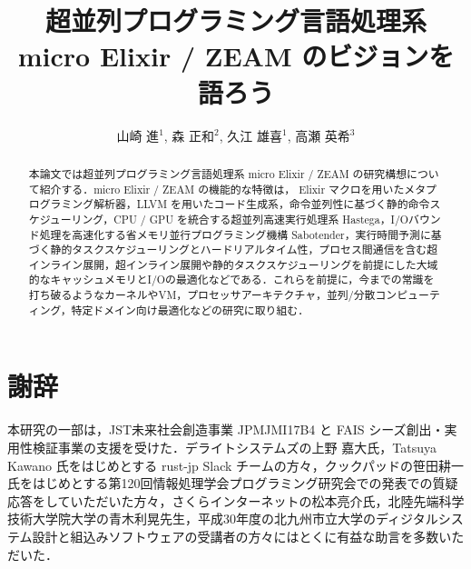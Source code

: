 \documentclass[japanese]{jssst_ppl}
\title{超並列プログラミング言語処理系 micro Elixir / ZEAM のビジョンを語ろう}
\author{山崎 進$^1$, 森 正和$^2$, 久江 雄喜$^1$, 高瀬 英希$^3$}
\begin{document}
\maketitle

\begin{abstract}
本論文では超並列プログラミング言語処理系 micro Elixir / ZEAM の研究構想について紹介する．micro Elixir / ZEAM の機能的な特徴は， Elixir マクロを用いたメタプログラミング解析器，LLVM を用いたコード生成系，命令並列性に基づく静的命令スケジューリング，CPU / GPU を統合する超並列高速実行処理系 Hastega，I/Oバウンド処理を高速化する省メモリ並行プログラミング機構 Sabotender，実行時間予測に基づく静的タスクスケジューリングとハードリアルタイム性，プロセス間通信を含む超インライン展開，超インライン展開や静的タスクスケジューリングを前提にした大域的なキャッシュメモリとI/Oの最適化などである．これらを前提に，今までの常識を打ち破るようなカーネルやVM，プロセッサアーキテクチャ，並列/分散コンピューティング，特定ドメイン向け最適化などの研究に取り組む．
\end{abstract}



\section*{謝辞}

本研究の一部は，JST未来社会創造事業 JPMJMI17B4 と FAIS シーズ創出・実用性検証事業の支援を受けた．デライトシステムズの上野 嘉大氏，Tatsuya Kawano 氏をはじめとする rust-jp Slack チームの方々，クックパッドの笹田耕一氏をはじめとする第120回情報処理学会プログラミング研究会での発表\cite{ZACKY18J}での質疑応答をしていただいた方々，さくらインターネットの松本亮介氏，北陸先端科学技術大学院大学の青木利晃先生，平成30年度の北九州市立大学のディジタルシステム設計と組込みソフトウェアの受講者の方々にはとくに有益な助言を多数いただいた．




\end{document}
